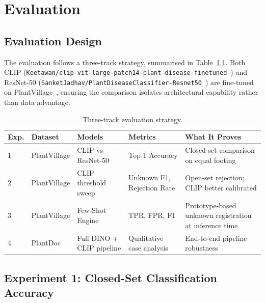 \chapter{Evaluation}

\section{Evaluation Design}

The evaluation follows a three-track strategy, summarised in
Table~\ref{tab:eval_strategy}.
Both CLIP (\texttt{Keetawan/clip-vit-large-patch14-plant-disease-finetuned}~\cite{keetawan2024plantdisease})
and ResNet-50 (\texttt{SanketJadhav/PlantDiseaseClassifier-Resnet50}~\cite{SanketJadhavplantdisease}) are
fine-tuned on PlantVillage~\cite{DBLP:journals/corr/HughesS15}, ensuring the comparison isolates architectural
capability rather than data advantage.

\begin{table}[h]
    \centering
    \caption{Three-track evaluation strategy.}
    \label{tab:eval_strategy}
    \begin{tabular}{p{1.2cm}p{2.5cm}p{3cm}p{3cm}p{4cm}}
        \hline
        \textbf{Exp.} & \textbf{Dataset} & \textbf{Models} & \textbf{Metrics} & \textbf{What It Proves} \\
        \hline
        1 & PlantVillage & CLIP vs ResNet-50 & Top-1 Accuracy & Closed-set comparison on equal footing \\
        \hline
        2 & PlantVillage & CLIP threshold sweep & Unknown F1, Rejection Rate & Open-set rejection; CLIP better calibrated \\
        \hline
        3 & PlantVillage & Few-Shot Engine & TPR, FPR, F1 & Prototype-based unknown registration at inference time \\
        \hline
        4 & PlantDoc & Full DINO + CLIP pipeline & Qualitative case analysis & End-to-end pipeline robustness \\
        \hline
    \end{tabular}
\end{table}

\section{Experiment 1: Closed-Set Classification Accuracy}
\label{sec:exp1}


